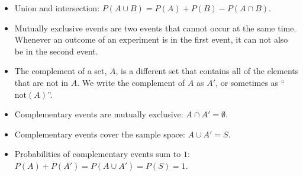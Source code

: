 \begin{itemize}
\item Union and intersection: $P(A \cup B) = P(A) + P(B) - P(A \cap B)$.


\item Mutually exclusive events are two events that cannot occur at the same time. Whenever an outcome
  of an experiment is in the first event, it can not also be in the
  second event.


\item The complement of a set, $A$, is a
  different set that contains all of the elements that are not in
  $A$. We write the complement of $A$ as $A'$, or
  sometimes as ``$\mbox{not}(A)$''.

\item Complementary events are mutually exclusive: $A \cap A' = \emptyset$.


\item Complementary events cover the sample space: $A \cup A' = S$.


\item Probabilities of complementary events sum to $1$: $P(A) + P(A') = P(A \cup A') = P(S) = 1$.

\end{itemize}

